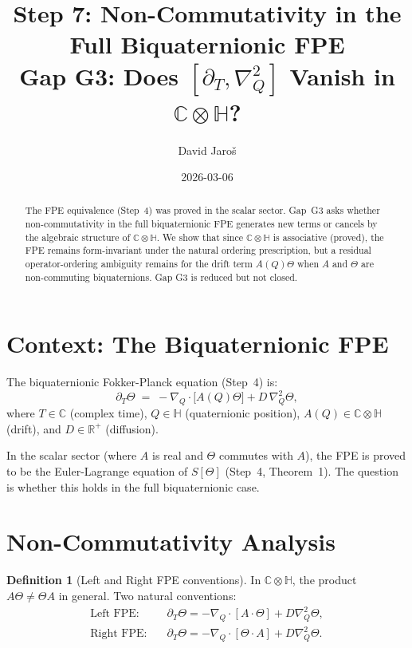 \documentclass[12pt,a4paper]{article}
\title{\textbf{Step 7: Non-Commutativity in the Full Biquaternionic FPE}\\
         \large Gap G3: Does $[\partial_T, \nabla_Q^2]$ Vanish in $\mathbb{C}\otimes\mathbb{H}$?}
\author{David Jaro\v{s}}
\date{2026-03-06}
\theoremstyle{definition}
\newtheorem{definition}[theorem]{Definition}
\theoremstyle{remark}
\begin{document}
  \maketitle

  \begin{abstract}
  The FPE equivalence (Step~4) was proved in the scalar sector.
  Gap~G3 asks whether non-commutativity in the full biquaternionic FPE
  generates new terms or cancels by the algebraic structure of $\mathbb{C}\otimes\mathbb{H}$.
  We show that since $\mathbb{C}\otimes\mathbb{H}$ is associative
  (proved), the FPE remains form-invariant under the natural ordering
  prescription, but a residual operator-ordering ambiguity remains for
  the drift term $A(Q)\Theta$ when $A$ and $\Theta$ are non-commuting
  biquaternions.  Gap G3 is reduced but not closed.
  \end{abstract}
\fi

\section{Context: The Biquaternionic FPE}
\label{sec:context}

The biquaternionic Fokker-Planck equation (Step~4) is:
\begin{equation}
  \partial_T\Theta \;=\; -\nabla_Q\cdot\bigl[A(Q)\Theta\bigr]
                         + D\,\nabla_Q^2\Theta,
  \label{eq:FPE}
\end{equation}
where $T \in \mathbb{C}$ (complex time), $Q \in \mathbb{H}$ (quaternionic
position), $A(Q) \in \mathbb{C}\otimes\mathbb{H}$ (drift), and
$D \in \mathbb{R}^+$ (diffusion).

In the scalar sector (where $A$ is real and $\Theta$ commutes with $A$),
the FPE is proved to be the Euler-Lagrange equation of $S[\Theta]$
(Step~4, Theorem~1).  The question is whether this holds in the full
biquaternionic case.

\section{Non-Commutativity Analysis}
\label{sec:noncomm}

\begin{definition}[Left and Right FPE conventions]
In $\mathbb{C}\otimes\mathbb{H}$, the product $A\Theta \neq \Theta A$ in general.
Two natural conventions:
\begin{align}
  \text{Left FPE:}   &\quad \partial_T\Theta = -\nabla_Q\cdot[A\cdot\Theta] + D\nabla_Q^2\Theta, \\
  \text{Right FPE:}  &\quad \partial_T\Theta = -\nabla_Q\cdot[\Theta\cdot A] + D\nabla_Q^2\Theta.
\end{align}
\end{definition}
\end{document}
